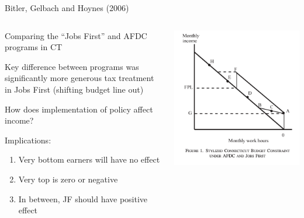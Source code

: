 \documentclass[notes,11pt, aspectratio=169]{beamer}
\newenvironment{wideitemize}{\itemize\addtolength{\itemsep}{10pt}}{\enditemize}
\begin{document}
\begin{frame}{Bitler, Gelbach and Hoynes (2006)}
  \begin{columns}[T] %
\begin{column}{.5\textwidth}
  \begin{wideitemize}
  \item Comparing the ``Jobs First'' and AFDC programs in CT
  \item Key difference between programs was significantly more
    generous tax treatment in Jobs First (shifting budget line out)
  \item How does implementation of policy affect income?
  \item Implications:
    \begin{enumerate}
    \item Very bottom earners will have no effect
    \item Very top is zero or negative
    \item In between, JF should have positive effect
    \end{enumerate}
  \end{wideitemize}
  \end{column}%
  \hfill%
  \begin{column}{.5\textwidth}
    \includegraphics[width=\textwidth]{bitler_budget.png}
  \end{column}
\end{columns}
\end{frame}
\end{document}
